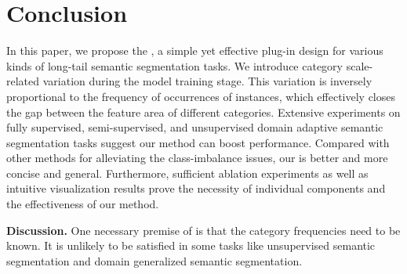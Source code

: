 \section{Conclusion}\label{sec:conclusion}
In this paper, we propose the \method, a simple yet effective plug-in design for various kinds of long-tail semantic segmentation tasks. 
%
We introduce category scale-related variation during the model training stage.
%
This variation is inversely proportional to the frequency of occurrences of instances, which effectively closes the gap between the feature area of different categories.
%
Extensive experiments on fully supervised, semi-supervised, and unsupervised domain adaptive semantic segmentation tasks suggest our method can boost performance.
%
Compared with other methods for alleviating the class-imbalance issues, our \method is better and more concise and general.
%
Furthermore, sufficient ablation experiments as well as intuitive visualization results prove the necessity of individual components and the effectiveness of our method.
%


\noindent\textbf{Discussion.} One necessary premise of \method is that the category frequencies need to be known.
%
It is unlikely to be satisfied in some tasks like unsupervised semantic segmentation and  domain generalized semantic segmentation.
%

%